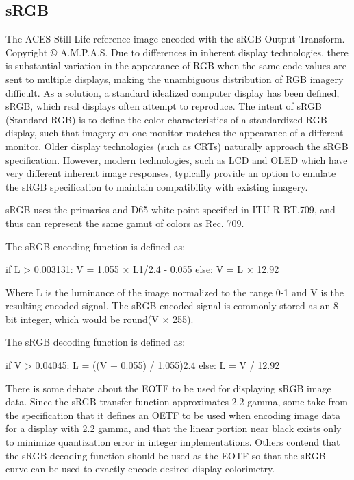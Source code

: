 \subsection{sRGB}%
\label{subsec:srgb}

The ACES Still Life reference image encoded with the sRGB Output Transform.
Copyright © A.M.P.A.S.
Due to differences in inherent display technologies, there is substantial variation in the appearance of RGB when the same code values are sent to multiple displays, making the unambiguous distribution of RGB imagery difficult. As a solution, a standard idealized computer display has been defined, sRGB, which real displays often attempt to reproduce. The intent of sRGB (Standard RGB) is to define the color characteristics of a standardized RGB display, such that imagery on one monitor matches the appearance of a different monitor. Older display technologies (such as CRTs) naturally approach the sRGB specification. However, modern technologies, such as LCD and OLED which have very different inherent image responses, typically provide an option to emulate the sRGB specification to maintain compatibility with existing imagery.

sRGB uses the primaries and D65 white point specified in ITU-R BT.709, and thus can represent the same gamut of colors as Rec. 709.

The sRGB encoding function is defined as:

	if L > 0.003131:
            		V = 1.055 × L1/2.4 - 0.055
	else:
		V = L × 12.92

Where L is the luminance of the image normalized to the range 0-1 and V is the resulting encoded signal. The sRGB encoded signal is commonly stored as an 8 bit integer, which would be round(V × 255).

The sRGB decoding function is defined as:

	if V > 0.04045:
            		L = ((V + 0.055) / 1.055)2.4
	else:
		L = V / 12.92

There is some debate about the EOTF to be used for displaying sRGB image data. Since the sRGB transfer function approximates 2.2 gamma, some take from the specification that it defines an OETF to be used when encoding image data for a display with 2.2 gamma, and that the linear portion near black exists only to minimize quantization error in integer implementations. Others contend that the sRGB decoding function should be used as the EOTF so that the sRGB curve can be used to exactly encode desired display colorimetry.

